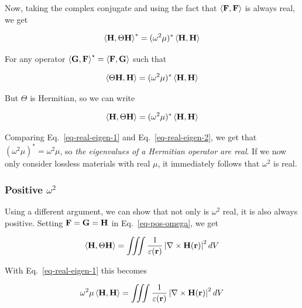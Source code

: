 Now, taking the complex conjugate and using the fact that $\left\langle {\bf F}, {\bf F}\right\rangle$ is always real, we get

\begin{equation}
\left\langle{\bf H} , \Theta {\bf H}\right\rangle^*  = (\omega^2 \mu)^* \left\langle {\bf H} , {\bf H}\right\rangle 
\end{equation} 

For any operator $\left\langle {\bf G}, {\bf F}\right\rangle ^*  = \left\langle {\bf F}, {\bf G}\right\rangle$ such that

\begin{equation}
\left\langle \Theta {\bf H} , {\bf H} \right\rangle  = (\omega^2 \mu)^* \left\langle {\bf H} , {\bf H}\right\rangle 
\end{equation} 

But $\Theta$ is Hermitian, so we can write

\begin{equation}
\left\langle {\bf H} , \Theta {\bf H} \right\rangle  = (\omega^2 \mu)^* \left\langle {\bf H} , {\bf H}\right\rangle \label{eq-real-eigen-2}
\end{equation} 

Comparing Eq.~\ref{eq-real-eigen-1} and Eq.~\ref{eq-real-eigen-2}, we get that $(\omega^2 \mu)^* = \omega^2 \mu$, so \emph{the eigenvalues of a Hermitian operator are real}. If we now only consider lossless materials with real $\mu$, it immediately follows that $\omega^2$ is real.

\subsubsection{Positive $\omega^2$}

Using a different argument, we can show that not only is $\omega^2$ real, it is also always positive. Setting ${\bf F}={\bf G}={\bf H}$ in Eq.~\ref{eq-pos-omega}, we get

\begin{equation}
\left\langle {\bf H}, \Theta {\bf H}\right\rangle = \iiint \frac{1}{\varepsilon({\bf r})} \left | \nabla \times {\bf H({\bf r})} \right |^2  dV 
\label{eq-rot-H-bis}
\end{equation} 

With Eq.~\ref{eq-real-eigen-1} this becomes

\begin{equation}
\omega^2 \mu \left\langle {\bf H} , {\bf H}\right\rangle = \iiint \frac{1}{\varepsilon({\bf r})} \left | \nabla \times {\bf H({\bf r})} \right |^2  dV \label{eq-omega-pos}
\end{equation} 

